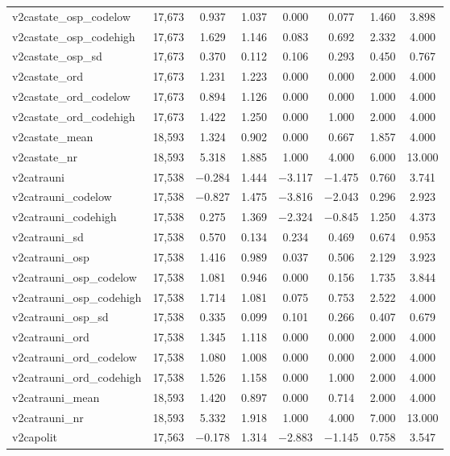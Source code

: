 \begin{table}[!htbp]
\begin{tabular}{@{\extracolsep{5pt}}lccccccc}
v2castate\_osp\_codelow & 17,673 & 0.937 & 1.037 & 0.000 & 0.077 & 1.460 & 3.898 \\ 
v2castate\_osp\_codehigh & 17,673 & 1.629 & 1.146 & 0.083 & 0.692 & 2.332 & 4.000 \\ 
v2castate\_osp\_sd & 17,673 & 0.370 & 0.112 & 0.106 & 0.293 & 0.450 & 0.767 \\ 
v2castate\_ord & 17,673 & 1.231 & 1.223 & 0.000 & 0.000 & 2.000 & 4.000 \\ 
v2castate\_ord\_codelow & 17,673 & 0.894 & 1.126 & 0.000 & 0.000 & 1.000 & 4.000 \\ 
v2castate\_ord\_codehigh & 17,673 & 1.422 & 1.250 & 0.000 & 1.000 & 2.000 & 4.000 \\ 
v2castate\_mean & 18,593 & 1.324 & 0.902 & 0.000 & 0.667 & 1.857 & 4.000 \\ 
v2castate\_nr & 18,593 & 5.318 & 1.885 & 1.000 & 4.000 & 6.000 & 13.000 \\ 
v2catrauni & 17,538 & $-$0.284 & 1.444 & $-$3.117 & $-$1.475 & 0.760 & 3.741 \\ 
v2catrauni\_codelow & 17,538 & $-$0.827 & 1.475 & $-$3.816 & $-$2.043 & 0.296 & 2.923 \\ 
v2catrauni\_codehigh & 17,538 & 0.275 & 1.369 & $-$2.324 & $-$0.845 & 1.250 & 4.373 \\ 
v2catrauni\_sd & 17,538 & 0.570 & 0.134 & 0.234 & 0.469 & 0.674 & 0.953 \\ 
v2catrauni\_osp & 17,538 & 1.416 & 0.989 & 0.037 & 0.506 & 2.129 & 3.923 \\ 
v2catrauni\_osp\_codelow & 17,538 & 1.081 & 0.946 & 0.000 & 0.156 & 1.735 & 3.844 \\ 
v2catrauni\_osp\_codehigh & 17,538 & 1.714 & 1.081 & 0.075 & 0.753 & 2.522 & 4.000 \\ 
v2catrauni\_osp\_sd & 17,538 & 0.335 & 0.099 & 0.101 & 0.266 & 0.407 & 0.679 \\ 
v2catrauni\_ord & 17,538 & 1.345 & 1.118 & 0.000 & 0.000 & 2.000 & 4.000 \\ 
v2catrauni\_ord\_codelow & 17,538 & 1.080 & 1.008 & 0.000 & 0.000 & 2.000 & 4.000 \\ 
v2catrauni\_ord\_codehigh & 17,538 & 1.526 & 1.158 & 0.000 & 1.000 & 2.000 & 4.000 \\ 
v2catrauni\_mean & 18,593 & 1.420 & 0.897 & 0.000 & 0.714 & 2.000 & 4.000 \\ 
v2catrauni\_nr & 18,593 & 5.332 & 1.918 & 1.000 & 4.000 & 7.000 & 13.000 \\ 
v2capolit & 17,563 & $-$0.178 & 1.314 & $-$2.883 & $-$1.145 & 0.758 & 3.547 \\ 

\end{tabular}
\end{table}
